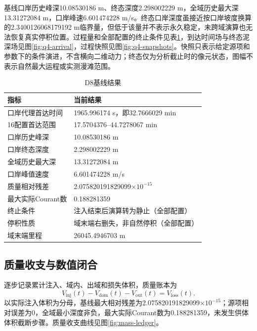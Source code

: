 基线口岸历史峰深10.08530186 m、终态深度2.298002229 m，全域历史最大深13.31272084 m，口岸峰速6.601474228 m/s。终态口岸深度虽接近按口岸坡度换算的2.3400126068179192 m临界量，但低于该量并不表示永久稳定，未跨域演算也无法恢复真实停积位置。过程量和全部配置的终止条件见表\ref{tab:q4-results}，到达时间场与终态泥深场见图\ref{fig:q4-arrival}，过程快照见图\ref{fig:q4-snapshots}。快照只表示给定源项和参数下的条件演进，不含横向二维动力；终态仅为分析截止时的像元状态，图幅不表示自然最大运程或实测漫滩范围。



\begin{table}[htbp]\centering\small
\caption{D8基线结果}\label{tab:q4-results}
\begin{tabular}{@{}l l@{}}
\toprule
指标&当前结果\\
\midrule
口岸代理首达时间&1965.996174 s，即32.7666029 min\\
16配置首达范围&17.5704376--44.7278067 min\\
口岸历史峰深&10.08530186 m\\
口岸终态深度&2.298002229 m\\
全域历史最大深&13.31272084 m\\
口岸峰值速度&6.601474228 m/s\\
质量相对残差&2.075820191829099$\times10^{-15}$\\
最大实际Courant数&0.188281359\\
终止条件&注入结束后演算转为静止（全部配置）\\
停积性质&域末端右删失，非自然停积（全部配置）\\
域末端里程&26045.4946703 m\\
\bottomrule
\end{tabular}
\end{table}

\subsection{质量收支与数值闭合}
逐步记录累计注入、域内、出域和损失体积，质量账本为
\begin{equation}
V_{\mathrm{inj}}(t)-V_{\mathrm{dom}}(t)-V_{\mathrm{out}}(t)
=V_{\mathrm{loss}}(t).
\end{equation}
以实际注入体积为分母，基线最大相对残差为2.075820191829099$\times10^{-15}$；源项相对误差为0，全域最小深度非负，最大实际Courant数为0.188281359，未发生供体体积截断步骤。质量收支曲线见图\ref{fig:mass-ledger}。

